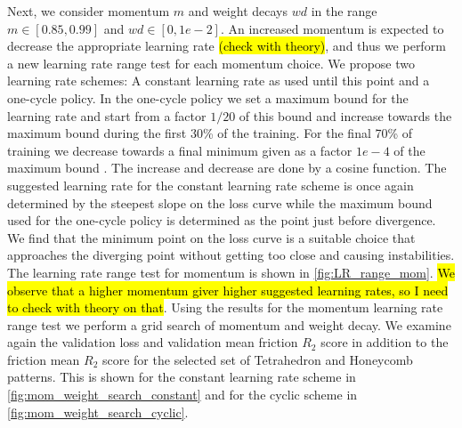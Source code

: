 Next, we consider momentum $m$ and weight decays $wd$ in the range $m \in [0.85,
0.99]$ and $wd \in [0, 1e-2]$. An increased momentum is expected to decrease the
appropriate learning rate \hl{(check with theory)}, and thus we perform a new learning rate range test
for each momentum choice. We propose two learning rate schemes: A constant
learning rate as used until this point and a one-cycle policy. In the one-cycle
policy we set a maximum bound for the learning rate and start from a factor
$1/20$ of this bound and increase towards the maximum bound during the first
30\% of the training. For the final 70\% of training we decrease towards a final
minimum given as a factor $1e-4$ of the maximum bound . The increase and
decrease are done by a cosine function. The suggested learning rate for the
constant learning rate scheme is once again determined by the steepest slope on
the loss curve while the maximum bound used for the one-cycle policy is
determined as the point just before divergence. We find that the minimum point
on the loss curve is a suitable choice that approaches the diverging point
without getting too close and causing instabilities. The learning rate range
test for momentum is shown in \cref{fig:LR_range_mom}. \hl{We observe that a higher momentum giver higher suggested learning rates, so I need to check with theory on that}. Using the results for the momentum learning rate range test we perform a grid search of momentum and
weight decay. We examine again the validation loss and validation mean friction
$R_2$ score in addition to the friction mean $R_2$ score for the selected set of
Tetrahedron and Honeycomb patterns. This is shown for the constant learning rate
scheme in \cref{fig:mom_weight_search_constant} and for the cyclic scheme in
\cref{fig:mom_weight_search_cyclic}.


